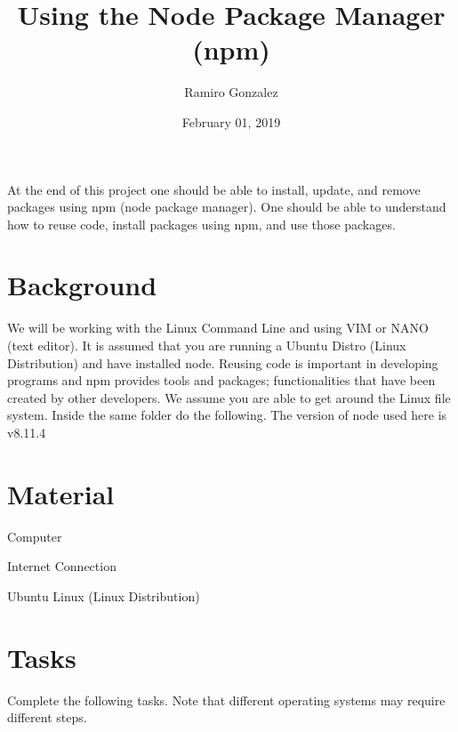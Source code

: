 \documentclass[12pt]{article}
\begin{document}
\title{Using the Node Package Manager (npm) }
\author{Ramiro Gonzalez}
\date{February 01, 2019}

\maketitle

\begin{Objective}
	At the end of this project one should be able to install, update, and remove packages using npm (node package manager). One should be able to understand how to reuse code, install packages using npm, and use those packages. 
\end{Objective}

\section*{Background}
  We will be working with the Linux Command Line and using VIM or NANO (text editor). It is assumed that you are running a Ubuntu Distro (Linux Distribution) and have installed node. Reusing code is important in developing programs and npm provides tools and packages; functionalities that have been created by other developers. We assume you are able to get around the Linux file system. Inside the same folder do the following. The version of node used here is v8.11.4 
\section*{Material}
 \color{black}
\begin{todolist}
    \item Computer 
    \item Internet Connection
    \item Ubuntu Linux (Linux Distribution) 
\end{todolist}
\section{Tasks}
Complete the following tasks. Note that different operating systems may require different steps. 
\end{document}

